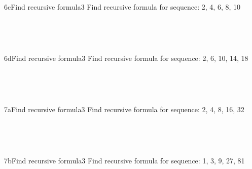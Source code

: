\documentclass[a4paper,12pt]{book}
\begin{document}
    ~\\
    
    \hrulefill
    
    ~\\
    \begin{answersheetquestion}{6c}{Find recursive formula}{3}
        Find recursive formula for sequence: 2, 4, 6, 8, 10
        \iftoggle{answerkey}{ \begin{answer} $a_{1} = 2$; $a_{n} = a_{n-1} + 2$ \end{answer} }{ { ~\\ \raisebox{0pt}[2cm][0pt]{  } } }
    \end{answersheetquestion}

    ~\\
    
    \hrulefill
    
    ~\\
    \begin{answersheetquestion}{6d}{Find recursive formula}{3}
        Find recursive formula for sequence: 2, 6, 10, 14, 18
        \iftoggle{answerkey}{ \begin{answer} $a_{1} = 2$; $a_{n} = a_{n-1} + 4$ \end{answer} }{ { ~\\ \raisebox{0pt}[2cm][0pt]{  } } }
    \end{answersheetquestion}

    ~\\
    
    \hrulefill
    
    ~\\
    \begin{answersheetquestion}{7a}{Find recursive formula}{3}
        Find recursive formula for sequence: 2, 4, 8, 16, 32
        \iftoggle{answerkey}{ \begin{answer} $a_{1} = 2$; $a_{n} = 2 \cdot a_{n-1}$ \end{answer} }{ { ~\\ \raisebox{0pt}[2cm][0pt]{  } } }
    \end{answersheetquestion}

    ~\\
    
    \hrulefill
    
    ~\\
    \begin{answersheetquestion}{7b}{Find recursive formula}{3}
        Find recursive formula for sequence: 1, 3, 9, 27, 81
        \iftoggle{answerkey}{ \begin{answer} $a_{1} = 1$; $a_{n} = 3 \cdot a_{n-1}$ \end{answer} }{ { ~\\ \raisebox{0pt}[2cm][0pt]{  } } }
    \end{answersheetquestion}
\end{document}

